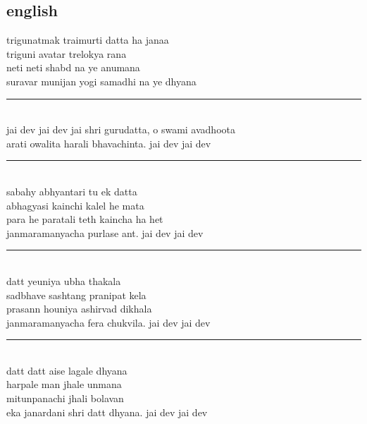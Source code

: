 \documentclass[letterpaper,twocolumn,openany,nodeprecatedcode]{dndbook}
\begin{document}
\begin{flushleft}
  \subsection*{english}
  trigunatmak traimurti datta ha janaa \\ triguni avatar trelokya rana \\ neti neti shabd na ye anumana \\ suravar munijan yogi samadhi na ye dhyana \\
  \rule{\linewidth}{1pt} \\
  jai dev jai dev jai shri gurudatta, o swami avadhoota \\ arati owalita harali bhavachinta. jai dev jai dev
  \rule{\linewidth}{1pt} \\
  sabahy abhyantari tu ek datta \\ abhagyasi kainchi kalel he mata \\ para he paratali teth kaincha ha het \\ janmaramanyacha purlase ant. jai dev jai dev
  \rule{\linewidth}{1pt} \\
  datt yeuniya ubha thakala \\ sadbhave sashtang pranipat kela \\ prasann houniya ashirvad dikhala \\ janmaramanyacha fera chukvila. jai dev jai dev
  \rule{\linewidth}{1pt} \\
  datt datt aise lagale dhyana \\ harpale man jhale unmana \\ mitunpanachi jhali bolavan \\ eka janardani shri datt dhyana. jai dev jai dev
\end{flushleft}
\pagebreak
\end{document}
